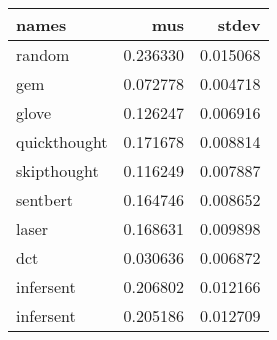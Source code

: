 \begin{tabular}{lrr}
\toprule
        names &       mus &     stdev \\
\midrule
       random &  0.236330 &  0.015068 \\
          gem &  0.072778 &  0.004718 \\
        glove &  0.126247 &  0.006916 \\
 quickthought &  0.171678 &  0.008814 \\
  skipthought &  0.116249 &  0.007887 \\
     sentbert &  0.164746 &  0.008652 \\
        laser &  0.168631 &  0.009898 \\
          dct &  0.030636 &  0.006872 \\
    infersent &  0.206802 &  0.012166 \\
    infersent &  0.205186 &  0.012709 \\
\bottomrule
\end{tabular}
